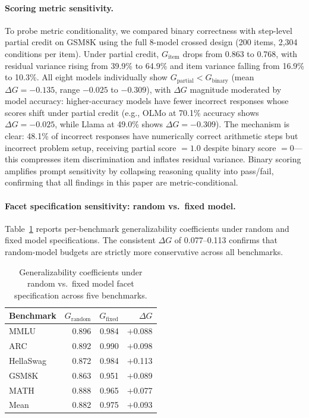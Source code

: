 \paragraph{Scoring metric sensitivity.}
\label{sec:partial_credit}
To probe metric conditionality, we compared binary correctness with step-level partial credit on GSM8K using the full 8-model crossed design (200 items, 2,304 conditions per item). Under partial credit, $G_\text{item}$ drops from 0.863 to 0.768, with residual variance rising from 39.9\% to 64.9\% and item variance falling from 16.9\% to 10.3\%. All eight models individually show $G_\text{partial} < G_\text{binary}$ (mean $\Delta G = -0.135$, range $-0.025$ to $-0.309$), with $\Delta G$ magnitude moderated by model accuracy: higher-accuracy models have fewer incorrect responses whose scores shift under partial credit (e.g., OLMo at 70.1\% accuracy shows $\Delta G = -0.025$, while Llama at 49.0\% shows $\Delta G = -0.309$). The mechanism is clear: 48.1\% of incorrect responses have numerically correct arithmetic steps but incorrect problem setup, receiving partial score $= 1.0$ despite binary score $= 0$---this compresses item discrimination and inflates residual variance. Binary scoring amplifies prompt sensitivity by collapsing reasoning quality into pass/fail, confirming that all findings in this paper are metric-conditional.

\paragraph{Facet specification sensitivity: random vs.\ fixed model.} Table~\ref{tab:fixed_vs_random} reports per-benchmark generalizability coefficients under random and fixed model specifications. The consistent $\Delta G$ of 0.077--0.113 confirms that random-model budgets are strictly more conservative across all benchmarks.

\begin{table}[h]
\centering
\caption{Generalizability coefficients under random vs.\ fixed model facet specification across five benchmarks.}
\label{tab:fixed_vs_random}
\scriptsize
\begin{tabular}{lrrr}
\toprule
Benchmark & $G_\text{random}$ & $G_\text{fixed}$ & $\Delta G$ \\
\midrule
MMLU & 0.896 & 0.984 & $+$0.088 \\
ARC & 0.892 & 0.990 & $+$0.098 \\
HellaSwag & 0.872 & 0.984 & $+$0.113 \\
GSM8K & 0.863 & 0.951 & $+$0.089 \\
MATH & 0.888 & 0.965 & $+$0.077 \\
\midrule
Mean & 0.882 & 0.975 & $+$0.093 \\
\bottomrule
\end{tabular}
\end{table}

